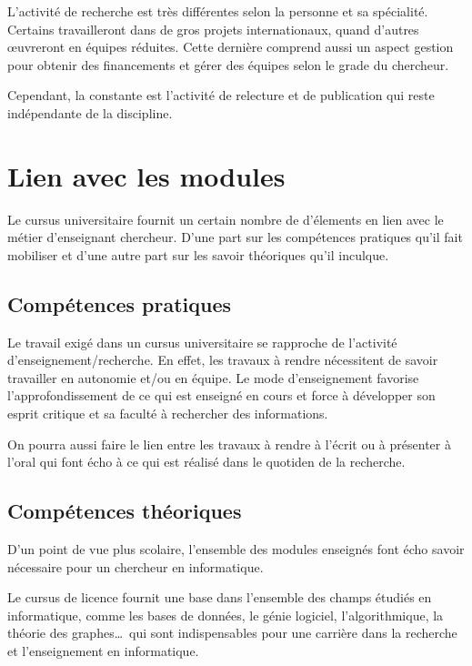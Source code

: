 \documentclass[12pt, a4paper]{report}
\begin{document}
    L'activité de recherche est très différentes selon la personne et sa spécialité. Certains travailleront dans de gros projets internationaux, quand d'autres œuvreront en équipes réduites.
    Cette dernière comprend aussi un aspect gestion pour obtenir des financements et gérer des équipes selon le grade du chercheur.

    Cependant, la constante est l'activité de relecture et de publication qui reste indépendante de la discipline.

  \section{Lien avec les modules}

	Le cursus universitaire fournit un certain nombre de d'élements en lien avec le métier d'enseignant chercheur. D'une part sur les compétences pratiques qu'il fait mobiliser et d'une autre part sur les savoir théoriques qu'il inculque.

    \subsection{Compétences pratiques}


    Le travail exigé dans un cursus universitaire se rapproche de l'activité d'enseignement/recherche. En effet, les travaux à rendre nécessitent de savoir travailler en autonomie et/ou en équipe.
    Le mode d'enseignement favorise l'approfondissement de ce qui est enseigné en cours et force à développer son esprit critique et sa faculté à rechercher des informations.

    On pourra aussi faire le lien entre les travaux à rendre à l'écrit ou à présenter à l'oral qui font écho à ce qui est réalisé dans le quotiden de la recherche.

    \subsection{Compétences théoriques}

    D'un point de vue plus scolaire, l'ensemble des modules enseignés font écho savoir nécessaire pour un chercheur en informatique.

    Le cursus de licence fournit une base dans l'ensemble des champs étudiés en informatique, comme les bases de données, le génie logiciel, l'algorithmique, la théorie des graphes\dots\ qui sont indispensables pour une carrière dans la recherche et l'enseignement en informatique.
\end{document}
